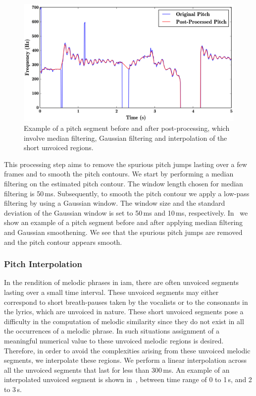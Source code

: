 {\begin{figure}
	\begin{center}
		\includegraphics[width=\figSizeHundred]{ch05_preprocessing/figures/smootheningExample.png}
	\end{center}
	\caption[Example of a post-processed predominant pitch segment]{Example of a pitch segment before and after post-processing, which involve median filtering, Gaussian filtering and interpolation of the short unvoiced regions.}
	\label{fig:smoothening_example}
\end{figure}

This processing step aims to remove the spurious pitch jumps lasting over a few frames and to smooth the pitch contours. We start by performing a median filtering on the estimated pitch contour. The window length chosen for median filtering is 50\,ms. Subsequently, to smooth the pitch contour we apply a low-pass filtering by using a Gaussian window. The window size and the standard deviation of the Gaussian window is set to 50\,ms and 10\,ms, respectively. In~ we show an example of a pitch segment before and after applying median filtering and Gaussian smoothening. We see that the spurious pitch jumps are removed and the pitch contour appears smooth.


\subsubsection{Pitch Interpolation}
\label{sec:data_processing_pitch_interpolation}

In the rendition of melodic phrases in \gls{iam}, there are often unvoiced segments lasting over a small time interval. These unvoiced segments may either correspond to short breath-pauses taken by the vocalists or to the consonants in the lyrics, which are unvoiced in nature. These short unvoiced segments pose a difficulty in the computation of melodic similarity since they do not exist in all the occurrences of a melodic phrase. In such situations assignment of a meaningful numerical value to these unvoiced melodic regions is desired. Therefore, in order to avoid the complexities arising from these unvoiced melodic segments, we interpolate these regions. We perform a linear interpolation across all the unvoiced segments that last for less than 300\,ms. An example of an interpolated unvoiced segment is shown in~, between time range of 0 to 1\,s, and 2 to 3\,s.

}
